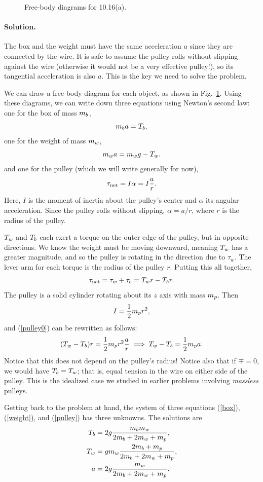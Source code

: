 \documentclass[11pt]{article}
\newcommand{\refeq}[1]{(\ref{#1})}
\newcommand{\beq}{\begin{equation*}}
\newcommand{\eeq}{\end{equation*}}
\newcommand{\beqn}{\begin{equation}}
\newcommand{\eeqn}{\end{equation}}
\newenvironment{solution}
{
    \paragraph{Solution.}
    \ignorespaces
}
{
    \bigskip
}
\begin{document}
\begin{figure}[b]
	\vspace{1.5in}
	\caption{Free-body diagrams for 10.16(a).}
	\label{E10.16a}
\end{figure}

\begin{solution}
	The box and the weight must have the same acceleration $a$ since they are connected by the wire.  It is safe to assume the pulley rolls without slipping against the wire (otherwise it would not be a very effective pulley!), so its tangential acceleration is also $a$.  This is the key we need to solve the problem.
	
	We can draw a free-body diagram for each object, as shown in Fig.~\ref{E10.16a}.  Using these diagrams, we can write down three equations using Newton's second law: one for the box of mass $m_b$,
	\beqn \label{box}
		\mb a = \Tb,
	\eeqn
	one for the weight of mass $m_w$,
	\beqn \label{weight}
		\mw a = \mw g - \Tw.
	\eeqn
	and one for the pulley (which we will write generally for now),
	\beqn \label{pulley0}
		\tnet = I \alpha = I \frac{a}{r}.
	\eeqn
	Here, $I$ is the moment of inertia about the pulley's center and $\alpha$ its angular acceleration.  Since the pulley rolls without slipping, $\alpha = a / r$, where $r$ is the radius of the pulley.
			
	$T_w$ and $T_b$ each exert a torque on the outer edge of the pulley, but in opposite directions.  We know the weight must be moving downward, meaning $T_w$ has a greater magnitude, and so the pulley is rotating in the direction due to $\tau_w$.  The lever arm for each torque is the radius of the pulley $r$.  Putting this all together,
	\beq
		\tnet = \tau_w + \tau_b = \Tw r - \Tb r.
	\eeq
	The pulley is a solid cylinder rotating about its $z$ axis with mass $m_p$.  Then
	\beq
		I = \frac{1}{2} \mmp r^2,
	\eeq
	and \refeq{pulley0} can be rewritten as follows:
	\beqn \label{pulley}
		(\Tw - \Tb) r = \frac{1}{2} \mmp r^2 \frac{a}{r} \implies \Tw - \Tb = \frac{1}{2} \mmp a.
	\eeqn
	Notice that this does not depend on the pulley's radius!  Notice also that if $\mp = 0$, we would have $T_b = T_w$; that is, equal tension in the wire on either side of the pulley.  This is the idealized case we studied in earlier problems involving \emph{massless} pulleys.

	Getting back to the problem at hand, the system of three equations \refeq{box}, \refeq{weight}, and \refeq{pulley} has three unknowns.  The solutions are
	\begin{align}
		T_b &= 2g \frac{m_b m_w}{2 m_b + 2 m_w + m_p}, \label{Tb} \\
		T_w &= g m_w \frac{2 m_b + m_p}{2 m_b + 2 m_w + m_p}, \label{Tw} \\
		a &= 2g \frac{m_w}{2 m_b + 2 m_w + m_p}. \label{acc}
	\end{align}
			

\end{solution}
\end{document}
